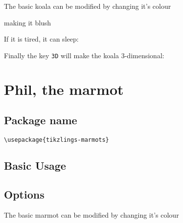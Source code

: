 \documentclass[parskip=half]{scrartcl}
\begin{document}
The basic koala can be modified by changing it's colour

\begin{tcblisting}{}
\koala[body=SteelBlue]
\end{tcblisting}

making it blush

\begin{tcblisting}{}
\koala[blush]
\end{tcblisting}

If it is tired, it can sleep:

\begin{tcblisting}{}
\koala[sleeping]
\end{tcblisting}

Finally the key \lstinline|3D| will make the koala 3-dimensional:

\begin{tcblisting}{}
\koala[3D]
\end{tcblisting}


\clearpage
\section[Marmot]{Phil, the marmot}

\subsection{Package name}

\begin{tcolorbox}[lower separated=false, lefthand width=.8\linewidth]
\vspace*{0.5cm}
\lstinline|\usepackage{tikzlings-marmots}|
\vspace*{0.5cm}
\end{tcolorbox}

\subsection{Basic Usage}

\begin{tcblisting}{}
\marmot
\end{tcblisting}

\subsection{Options}

The basic marmot can be modified by changing it's colour
\end{document}
